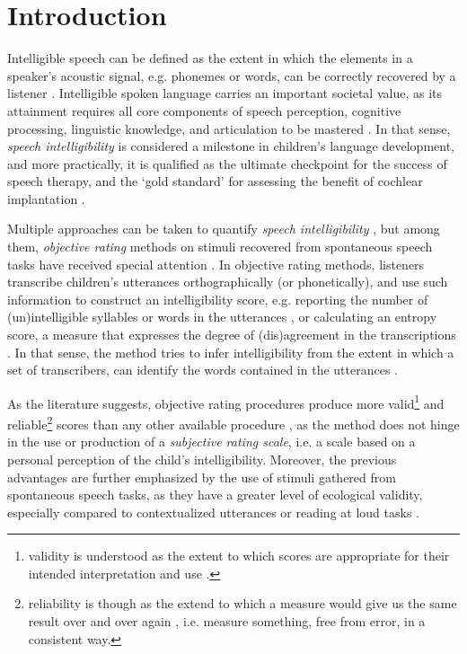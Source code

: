 \section{Introduction} \label{S:introduction}

Intelligible speech can be defined as the extent in which the elements in a speaker's acoustic signal, e.g. phonemes or words, can be correctly recovered by a listener \cite{Freeman_et_al_2017, Kent_et_al_1989, vanHeuven_2008, Whitehill_et_al_2004}. Intelligible spoken language carries an important societal value, as its attainment requires all core components of speech perception, cognitive processing, linguistic knowledge, and articulation to be mastered \cite{Freeman_et_al_2017}. In that sense, \textit{speech intelligibility} is considered a milestone in children's language development, and more practically, it is qualified as the ultimate checkpoint for the success of speech therapy, and the `gold standard' for assessing the benefit of cochlear implantation \cite{Chin_et_al_2012}. 

Multiple approaches can be taken to quantify \textit{speech intelligibility} \cite{Boonen_et_al_2020, Boonen_et_al_2021, Flipsen_2006, Hustad_et_al_2020}, but among them, \textit{objective rating} methods on stimuli recovered from spontaneous speech tasks have received special attention \cite{Boonen_et_al_2021, Hustad_et_al_2020}. In objective rating methods, listeners transcribe children's utterances orthographically (or phonetically), and use such information to construct an intelligibility score, e.g. reporting the number of (un)intelligible syllables or words in the utterances \cite{Flipsen_2006, Lagerberg_et_al_2014}, or calculating an entropy score, a measure that expresses the degree of (dis)agreement in the transcriptions \cite{Boonen_et_al_2021, Shannon_1948}. In that sense, the method tries to infer intelligibility from the extent in which a set of transcribers, can identify the words contained in the utterances \cite{Boonen_et_al_2021}. 

As the literature suggests, objective rating procedures produce more valid\footnote{validity is understood as the extent to which scores are appropriate for their intended interpretation and use \cite{Lesterhuis_2018, Trochim_2022}.} and reliable\footnote{reliability is though as the extend to which a measure would give us the same result over and over again \cite{Trochim_2022}, i.e. measure something, free from error, in a consistent way.} scores than any other available procedure \cite{Boonen_et_al_2021, Faes_et_al_2021}, as the method does not hinge in the use or production of a \textit{subjective rating scale}, i.e. a scale based on a personal perception of the child's intelligibility. Moreover, the previous advantages are further emphasized by the use of stimuli gathered from spontaneous speech tasks, as they have a greater level of ecological validity, especially compared to contextualized utterances or reading at loud tasks \cite{Flipsen_2006, Ertmer_2011}.

